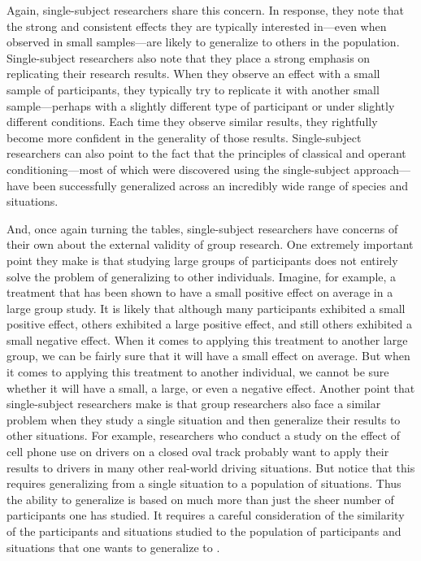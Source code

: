 Again, single-subject researchers share this concern. In response, they note that the strong and consistent effects they are typically interested in---even when observed in small samples---are likely to generalize to others in the population. Single-subject researchers also note that they place a strong emphasis on replicating their research results. When they observe an effect with a small sample of participants, they typically try to replicate it with another small sample---perhaps with a slightly different type of participant or under slightly different conditions. Each time they observe similar results, they rightfully become more confident in the generality of those results. Single-subject researchers can also point to the fact that the principles of classical and operant conditioning---most of which were discovered using the single-subject approach---have been successfully generalized across an incredibly wide range of species and situations.
 
 And, once again turning the tables, single-subject researchers have concerns of their own about the external validity of group research. One extremely important point they make is that studying large groups of participants does not entirely solve the problem of generalizing to other individuals. Imagine, for example, a treatment that has been shown to have a small positive effect on average in a large group study. It is likely that although many participants exhibited a small positive effect, others exhibited a large positive effect, and still others exhibited a small negative effect. When it comes to applying this treatment to another large group, we can be fairly sure that it will have a small effect on average. But when it comes to applying this treatment to another individual, we cannot be sure whether it will have a small, a large, or even a negative effect. Another point that single-subject researchers make is that group researchers also face a similar problem when they study a single situation and then generalize their results to other situations. For example, researchers who conduct a study on the effect of cell phone use on drivers on a closed oval track probably want to apply their results to drivers in many other real-world driving situations. But notice that this requires generalizing from a single situation to a population of situations. Thus the ability to generalize is based on much more than just the sheer number of participants one has studied. It requires a careful consideration of the similarity of the participants and situations studied to the population of participants and situations that one wants to generalize to \citep{shadish_experimental_2002}.
 
